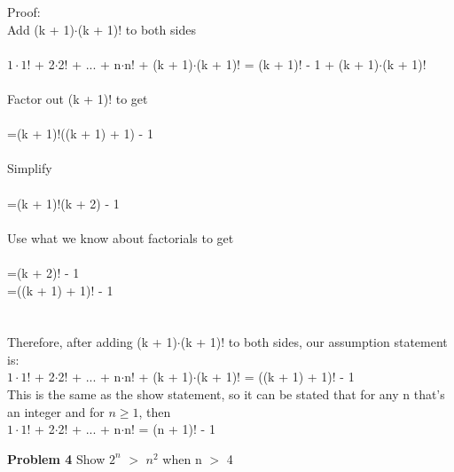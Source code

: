\documentclass[12pt]{article}
\begin{document}
Proof: \\
	Add (k + 1)$\cdot$(k + 1)! to both sides \\
	\\
	 $1\cdot1$! + 2$\cdot$2! + ... + n$\cdot$n! + (k + 1)$\cdot$(k + 1)! = (k + 1)! - 1 + (k + 1)$\cdot$(k + 1)!\\
	 \\
	 Factor out (k + 1)! to get\\
	 \\
	 =(k + 1)!((k + 1) + 1) - 1\\
	 \\
	 Simplify \\
	 \\
	 =(k + 1)!(k + 2) - 1 \\
	 \\
	 Use what we know about factorials to get\\
	 \\
	 =(k + 2)! - 1 \\
	 =((k + 1) + 1)! - 1 \\
	 \\
	 \\
	 Therefore, after adding (k + 1)$\cdot$(k + 1)! to both sides, our assumption statement is: \\
	 $1\cdot1$! + 2$\cdot$2! + ... + n$\cdot$n! + (k + 1)$\cdot$(k + 1)!  = ((k + 1) + 1)! - 1 \\
	 This is the same as the show statement, so it can be stated that for any n that's an integer
	 and for $n\geq1$, then \\
	 $1\cdot1$! + 2$\cdot$2! + ... + n$\cdot$n! = (n + 1)! - 1 \\


\par

\par
\bigskip
{\bf Problem
4
}
Show $2^{n}$ $>$ $n^{2}$ when n $>$ 4
\end{document}
